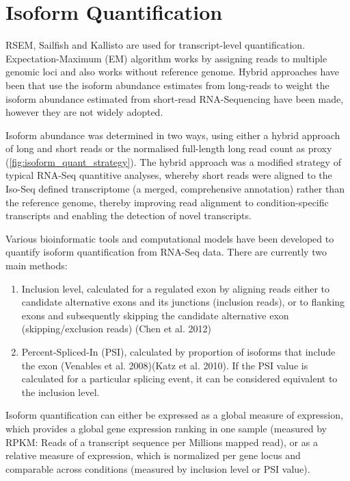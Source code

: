 \section{Isoform Quantification}
RSEM, Sailfish and Kallisto are used for transcript-level quantification. Expectation-Maximum (EM) algorithm works by assigning reads to multiple genomic loci and also works without reference genome. Hybrid approaches have been that use the isoform abundance estimates from long-reads to weight the isoform abundance estimated from short-read RNA-Sequencing have been made, however they are not widely adopted\cite{Bayega2018}.

Isoform abundance was determined in two ways, using either a hybrid approach of long and short reads or the normalised full-length long read count as proxy (\cref{fig:isoform_quant_strategy}). The hybrid approach was a modified strategy of typical RNA-Seq quantitive analyses, whereby short reads were aligned to the Iso-Seq defined transcriptome (a merged, comprehensive annotation) rather than the reference genome, thereby improving read alignment to condition-specific transcripts and enabling the detection of novel transcripts. 

Various bioinformatic tools and computational models have been developed to quantify isoform quantification from RNA-Seq data. There are currently two main methods:
\begin{enumerate}
	\item Inclusion level, calculated for a regulated exon by aligning reads either to candidate alternative exons and its junctions (inclusion reads), or to flanking exons and subsequently skipping the candidate alternative exon (skipping/exclusion reads) (Chen et al. 2012)
	\item Percent-Spliced-In (PSI), calculated by proportion of isoforms that include the exon (Venables et al. 2008)(Katz et al. 2010). If the PSI value is calculated for a particular splicing event, it can be considered equivalent to the inclusion level. 
\end{enumerate}
Isoform quantification can either be expressed as a global measure of expression, which provides a global gene expression ranking in one sample (measured by RPKM: Reads of a transcript sequence per Millions mapped read), or as a relative measure of expression, which is normalized per gene locus and comparable across conditions (measured by inclusion level or PSI value). 

